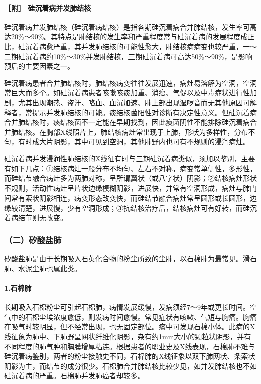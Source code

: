 \paragraph{［附］ 硅沉着病并发肺结核}

硅沉着病并发肺结核（硅沉着病结核）是指各期硅沉着病合并肺结核，发生率可高达20\%～90\%。其特点是肺结核的发生率和严重程度常与硅沉着病的发展程度成正比，硅沉着病愈严重，其并发肺结核的可能性愈大，肺结核病病变也较严重，一～二期硅沉着病约10\%～30\%并发肺结核，三期硅沉着病可高达50\%～90\%，是影响预后的主要因素之一。

硅沉着病患者合并肺结核时，肺结核病变往往发展迅速，病灶易溶解为空洞，空洞常巨大而多个。如硅沉着病患者咳嗽咳痰加重、消瘦、气促以及中毒症状进行性加剧，尤其出现潮热、盗汗、咯血、血沉加速、肺上部出现湿啰音而无其他原因可解释者，常提示并发肺结核的可能。痰结核菌阳性对诊断有决定性意义。但硅沉着病合并肺结核时，痰结核菌不一定能在早期找到，因此痰菌阴性不能排除硅沉着病合并肺结核。在胸部X线照片上，肺结核病灶常出现于上肺，形状为多样性，分布不匀，有时成大片阴影，其中可见到空洞，其他肺野内也可有不规则的浸润病灶。

硅沉着病并发浸润性肺结核的X线征有时与三期硅沉着病类似，须加以鉴别，主要有如下几点：①结核病灶一般分布不均匀、左右不对称，病变常单侧性，多形性，而硅结节融合病灶多为两肺对称，呈所谓翼状（或八字状）阴影；②结核病灶形状不规则，活动性病灶呈片状边缘模糊阴影，进展快，并常有空洞形成，病灶与肺门间常有索状阴影相连，病变形态改变快，而硅结节融合病灶常呈圆形或长圆形，边缘较清楚，进展慢，少有空洞形成；③抗结核治疗后，结核病灶可有好转，而硅沉着病结节则无改变。

\subsubsection{（二）矽酸盐肺}

矽酸盐肺是由于长期吸入石英化合物的粉尘所致的尘肺，以石棉肺为最常见。滑石肺、水泥尘肺也属此类。

\paragraph{1.石棉肺}

长期吸入石棉粉尘可引起石棉肺，病情发展缓慢，发病须经7～9年或更长时间。空气中的石棉尘埃浓度愈低，则发病时间愈慢。常见症状有咳嗽、气短与胸痛。胸痛在吸气时较明显，但不经常出现，也无固定部位。痰中可发现石棉小体。此病的X线征象为肺中、下肺野呈网状纤维化阴影，杂有约1mm大小的颗粒状阴影，并有不同程度的肺气肿和胸膜增厚粘连。根据患者的职业史及X线表现，石棉肺不难与硅沉着病鉴别，两者的粉尘接触史不同，石棉肺的X线征象以双下肺网状、条索状阴影为主，而结节的成分很少。石棉肺合并肺结核比较少见，如并发肺结核也不如硅沉着病的严重。石棉肺并发肺癌者却较多。

